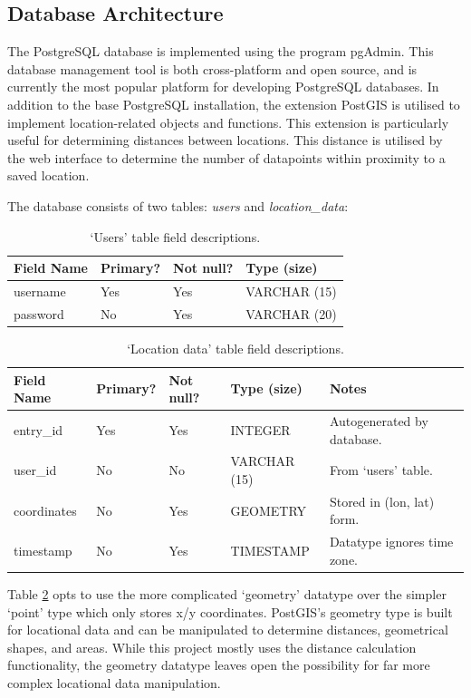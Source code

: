 \subsection{Database Architecture}
The PostgreSQL database is implemented using the program pgAdmin. This database management tool is both cross-platform and open source, and is currently the most popular platform for developing PostgreSQL databases\cite{pgAdmin}. In addition to the base PostgreSQL installation, the extension PostGIS is utilised to implement location-related objects and functions. This extension is particularly useful for determining distances between locations. This distance is utilised by the web interface to determine the number of datapoints within proximity to a saved location. 

The database consists of two tables: \textit{users} and \textit{location\_data}:

\begin{table}[!htbp]
    \centering
    \begin{tabular}{llll}
    \hline
    \textbf{Field Name} & \textbf{Primary?} & \textbf{Not null?} & \textbf{Type (size)}  \\ \hline
    username   & Yes      & Yes       & VARCHAR (15) \\ \hline
    password   & No       & Yes       & VARCHAR (20) \\ \hline
    \end{tabular}
    \caption{`Users' table field descriptions.}
    \label{tab:des_tab1}
\end{table}



\begin{table}[!htbp]
    \centering
    \begin{tabular}{lllll}
    \hline
    \textbf{Field Name} & \textbf{Primary?} & \textbf{Not null?} & \textbf{Type (size)} & \textbf{Notes}                          \\ \hline
    entry\_id           & Yes               & Yes                & INTEGER              & Autogenerated by database.              \\ \hline
    user\_id            & No                & No                 & VARCHAR (15)         & From `users' table. \\ \hline
    coordinates         & No                & Yes                & GEOMETRY             & Stored in (lon, lat) form.   \\ \hline
    timestamp           & No                & Yes                & TIMESTAMP            & Datatype ignores time zone.             \\ \hline
    \end{tabular}
    \caption{`Location data' table field descriptions.}
    \label{tab:des_tab2}
\end{table}

Table \ref{tab:des_tab2} opts to use the more complicated `geometry' datatype over the simpler `point' type which only stores x/y coordinates. PostGIS's geometry type is built for locational data and can be manipulated to determine distances, geometrical shapes, and areas. While this project mostly uses the distance calculation functionality, the geometry datatype leaves open the possibility for far more complex locational data manipulation.